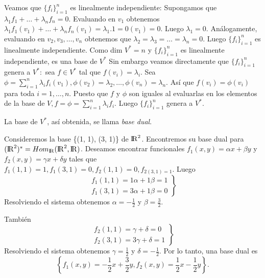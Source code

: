 		\begin{demo}
			\normalfont 
			Veamos que $ \{f_{i}\}^{n}_{i=1} $ es linealmente independiente: Supongamos que \\$ \lambda_{1}f_{1}+\ldots+\lambda_{n}f_{n} = 0 $. Evaluando en $ v_{1} $ obtenemos $ \lambda_{1}f_{1}(v_{1})+\ldots+\lambda_{n}f_{n}(v_{1}) = \lambda_{1}.1 = 0(v_{1}) = 0$. Luego $ \lambda_{1} = 0 $. Análogamente, evaluando en $ v_{2},v_{3},\ldots,v_{n} $ obtenemos que $ \lambda_{2} = \lambda_{3} = \ldots = \lambda_{n} = 0$. Luego  $ \{f_{i}\}^{n}_{i=1} $  es linealmente	independiente. Como dim $ V^{*} = n $ y $ \{f_{i}\}^{n}_{i=1} $ es linealmente independiente, es una
			base de $ V^{*} $ Sin embargo veamos directamente que $ \{f_{i}\}^{n}_{i=1} $ genera a $ V^{*} :$ sea $ f \in V^{*} $ tal que $ f(v_{i}) = \lambda_{i}$. Sea $ \phi = \sum^{n}_{i=1} \lambda_{i}f_{i}(v_{1}), \phi(v_{2}) = \lambda_{2},\ldots,\phi(v_{n}) = \lambda_{n}$. Así que $ f(v_{i}) = \phi(v_{i}) $ para toda $ i = 1, \ldots, n $. Puesto que $ f $ y $ \phi $  son iguales al evaluarlas en los elementos de la base de $ V, f = \phi = \sum^{n}_{i=1}\lambda_{i}f_{i} $. Luego $ \{f_{i}\}^{n}_{i=1} $ genera a $ V^{*} $. 
			
			La base de $ V^{*} $, así obtenida, se llama \textit{base dual}.
		\end{demo}
		\begin{ejem}
			\normalfont 
			 Consideremos la base \{(1, 1), (3, 1)\} de ${\rm I\!R}^{2}$. Encontremos su base dual para \\$({\rm I\!R}^{2})^{*} = Hom_{{\rm I\!R}} ({\rm I\!R}^{2},{\rm I\!R})$. Deseamos encontrar funcionales $ f_{1}(x,y) = \alpha x + \beta y $ y $ f_{2}(x,y) = \gamma x + \delta y $ tales que $ f_{1}(1,1) = 1,  f_{1}(3,1) = 0, f_{2}(1,1)= 0, f_{2(3,1) = 1}$. Luego 
			 \[ \left. \begin{array}{lc}
			 		f_{1}(1,1) = 1\alpha+1\beta = 1 \\ f_{1}(3,1) = 3\alpha+1\beta = 0
			 \end{array}\right\} \]
			 Resolviendo el sistema obtenemos $\alpha = -\frac{1}{2}$ y $ \beta = \frac{3}{2} $.
			 
			 También \[ \left.\begin{array}{lc}
			 f_{2}(1,1) = \gamma+\delta = 0 \\ f_{2}(3,1) = 3\gamma+\delta = 1
			 \end{array}\right\} \] 
			 Resolviendo el sistema obtenemos $\gamma = \frac{1}{2}$ y $ \delta = -\frac{1}{2} $. Por lo tanto, una base dual es  \[ \left\{f_{1}(x,y) = -\frac{1}{2}x+\frac{3}{2}y, f_{2}(x,y) = \frac{1}{2}x-\frac{1}{2}y\right\}. \] 
		\end{ejem}
